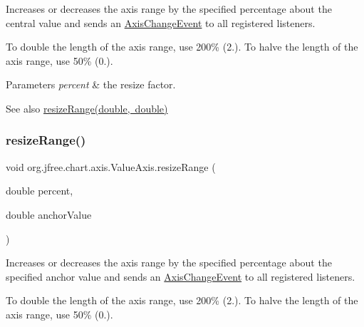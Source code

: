 Increases or decreases the axis range by the specified percentage about the central value and sends an \mbox{\hyperlink{}{Axis\+Change\+Event}} to all registered listeners. 

To double the length of the axis range, use 200\% (2.). To halve the length of the axis range, use 50\% (0.).


\begin{DoxyParams}{Parameters}
{\em percent} & the resize factor.\\
\hline
\end{DoxyParams}
\begin{DoxySeeAlso}{See also}
\mbox{\hyperlink{classorg_1_1jfree_1_1chart_1_1axis_1_1_value_axis_aa07f9611f6938490b51fbfe65fa55400}{resize\+Range(double, double)}} 
\end{DoxySeeAlso}
\mbox{\label{classorg_1_1jfree_1_1chart_1_1axis_1_1_value_axis_aa07f9611f6938490b51fbfe65fa55400}} 
\subsubsection{\texorpdfstring{resize\+Range()}{resizeRange()}\hspace{0.1cm}{\footnotesize\ttfamily [2/2]}}
{\footnotesize\ttfamily void org.\+jfree.\+chart.\+axis.\+Value\+Axis.\+resize\+Range (\begin{DoxyParamCaption}\item[{double}]{percent,  }\item[{double}]{anchor\+Value }\end{DoxyParamCaption})}

Increases or decreases the axis range by the specified percentage about the specified anchor value and sends an \mbox{\hyperlink{}{Axis\+Change\+Event}} to all registered listeners. 

To double the length of the axis range, use 200\% (2.). To halve the length of the axis range, use 50\% (0.).



